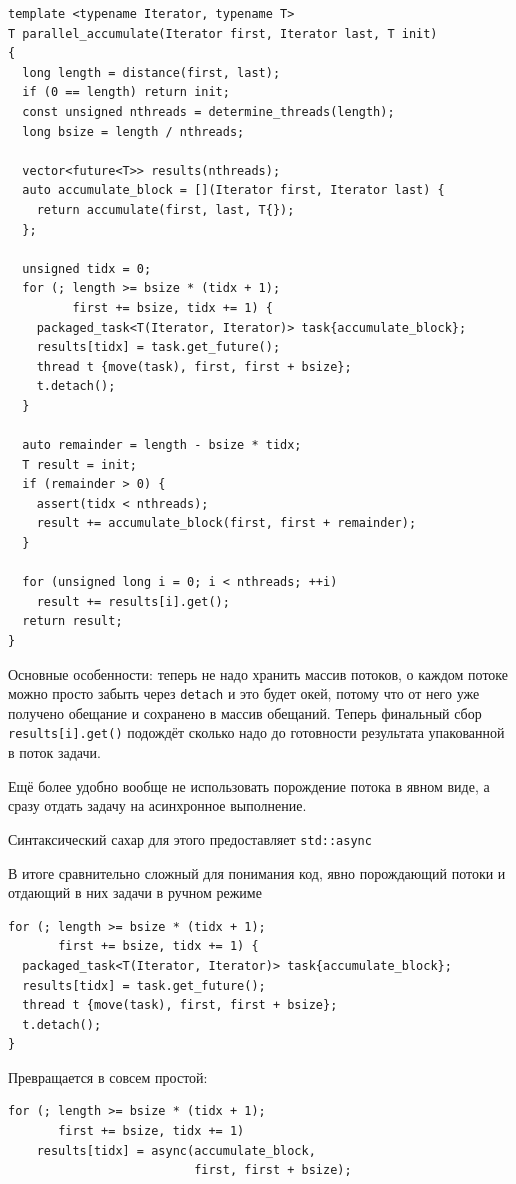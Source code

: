 \documentclass[a4paper,12pt,oneside]{book}
\begin{document}
\begin{lstlisting}
template <typename Iterator, typename T>
T parallel_accumulate(Iterator first, Iterator last, T init)
{
  long length = distance(first, last);
  if (0 == length) return init;
  const unsigned nthreads = determine_threads(length);
  long bsize = length / nthreads;

  vector<future<T>> results(nthreads);
  auto accumulate_block = [](Iterator first, Iterator last) {
    return accumulate(first, last, T{});
  };

  unsigned tidx = 0;
  for (; length >= bsize * (tidx + 1); 
         first += bsize, tidx += 1) {
    packaged_task<T(Iterator, Iterator)> task{accumulate_block};
    results[tidx] = task.get_future();
    thread t {move(task), first, first + bsize};
    t.detach();
  }

  auto remainder = length - bsize * tidx;
  T result = init;
  if (remainder > 0) {
    assert(tidx < nthreads);
    result += accumulate_block(first, first + remainder);
  }

  for (unsigned long i = 0; i < nthreads; ++i)
    result += results[i].get();
  return result;
}
\end{lstlisting}

Основные особенности: теперь не надо хранить массив потоков, о каждом потоке можно просто забыть через \lstinline!detach! и это будет окей, потому что от него уже получено обещание и сохранено в массив обещаний. Теперь финальный сбор \lstinline!results[i].get()! подождёт сколько надо до готовности результата упакованной в поток задачи.

Ещё более удобно вообще не использовать порождение потока в явном виде, а сразу отдать задачу на асинхронное выполнение.

Синтаксический сахар для этого предоставляет \lstinline!std::async!

В итоге сравнительно сложный для понимания код, явно порождающий потоки и отдающий в них задачи в ручном режиме

\begin{lstlisting}
for (; length >= bsize * (tidx + 1); 
       first += bsize, tidx += 1) {
  packaged_task<T(Iterator, Iterator)> task{accumulate_block};
  results[tidx] = task.get_future();
  thread t {move(task), first, first + bsize};
  t.detach();
}
\end{lstlisting}

Превращается в совсем простой:

\begin{lstlisting}
for (; length >= bsize * (tidx + 1); 
       first += bsize, tidx += 1)
    results[tidx] = async(accumulate_block, 
                          first, first + bsize);  
\end{lstlisting}
\end{document}
